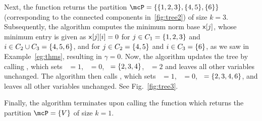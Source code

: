\begin{example}
	Next, the function
	\getPartition{$-\infty$} returns the partition $\mcP = \Set{\Set{1,2,3}, \Set{4,5}, \Set{6}}$
	(corresponding to the connected components in~\ref{fig:tree2})
	of size $k = 3$. 
	Subsequently, the algorithm computes the minimum norm base
	$\DataSty{x}[j]$, whose minimum entry is given as
	$\DataSty{x}[j][i] = 0$ for $j \in C_1 = \{1,2,3\}$ and $i\in C_2 \cup C_3 = \{4,5,6\}$,
	and for $j \in C_2 = \{4,5\}$ and $i\in C_3 = \{6\}$,
	as we saw in Example~\ref{eg:thms}, resulting in $\gamma = 0$. Now, the algorithm updates the tree by calling
	, which sets ~$ = 1$, ~$ = 0$, ~$ = \{2,3,4\}$, ~$ = 2$
	and leaves all other variables unchanged.
	The algorithm then calls , which sets ~$ = 1$, ~$ = 0$,
	~$ = \{2,3,4,6\}$, and leaves all other variables unchanged.
	See Fig.~\ref{fig:tree3}. 

	Finally, the algorithm terminates upon calling the function \getPartition{$-\infty$} which returns the
	partition $\mcP = \Set{V}$ of size $k=1$.
\end{example}

